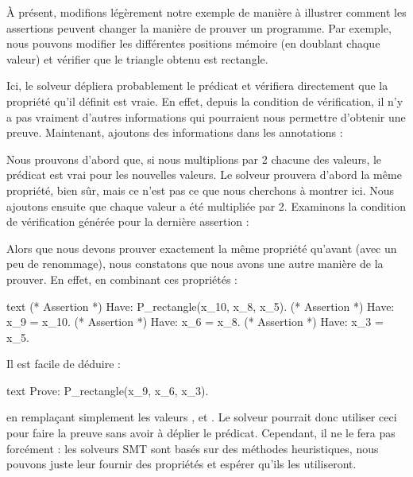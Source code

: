 À présent, modifions légèrement notre exemple de manière à illustrer comment les
assertions peuvent changer la manière de prouver un programme. Par exemple, nous
pouvons modifier les différentes positions mémoire (en doublant chaque valeur) et
vérifier que le triangle obtenu est rectangle.








Ici, le solveur dépliera probablement le prédicat et vérifiera directement
que la propriété qu'il définit est vraie. En effet, depuis la condition de
vérification, il n'y a pas vraiment d'autres informations qui pourraient nous
permettre d'obtenir une preuve. Maintenant, ajoutons des informations dans les
annotations :






Nous prouvons d'abord que, si nous multiplions par 2 chacune des valeurs, le
prédicat est vrai pour les nouvelles valeurs. Le solveur prouvera d'abord
la même propriété, bien sûr, mais ce n'est pas ce que nous cherchons à montrer
ici. Nous ajoutons ensuite que chaque valeur a été multipliée par 2.
Examinons la condition de vérification générée pour la dernière assertion :





Alors que nous devons prouver exactement la même propriété qu'avant (avec un peu
de renommage), nous constatons que nous avons une autre manière de la prouver.
En effet, en combinant ces propriétés :


\begin{CodeBlock}{text}
(* Assertion *)
Have: P_rectangle(x_10, x_8, x_5).
(* Assertion *)
Have: x_9 = x_10.
(* Assertion *)
Have: x_6 = x_8.
(* Assertion *)
Have: x_3 = x_5.
\end{CodeBlock}


Il est facile de déduire :
\begin{CodeBlock}{text}
Prove: P_rectangle(x_9, x_6, x_3).
\end{CodeBlock}
en remplaçant simplement les valeurs ,  et
. Le solveur pourrait donc utiliser ceci pour faire la preuve
sans avoir à déplier le prédicat. Cependant, il ne le fera pas forcément : les
solveurs SMT sont basés sur des méthodes heuristiques, nous pouvons juste leur
fournir des propriétés et espérer qu'ils les utiliseront.


